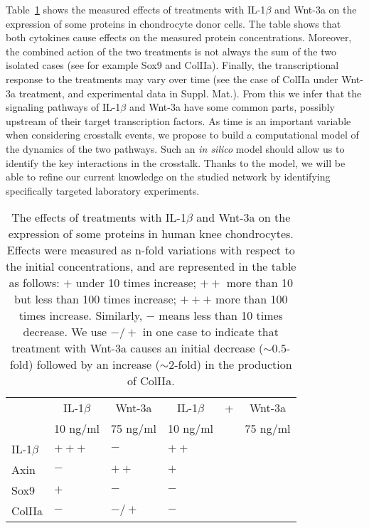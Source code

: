

Table~\ref{tab:pcr-effects} shows the measured effects of treatments with IL-1$\beta$ and Wnt-3a
on the expression of some proteins in chondrocyte donor cells.
The table shows that both cytokines cause effects on the measured protein concentrations. Moreover,
the combined action of the two treatments is not always the sum of the
two isolated cases (see for example Sox9 and ColIIa).
Finally, the transcriptional response to the treatments may vary over time (see the case of ColIIa
under Wnt-3a treatment, and experimental data in Suppl. Mat.).
From this we infer that the signaling pathways of IL-1$\beta$ and Wnt-3a have some common
parts, possibly upstream of their target transcription factors.
As time is an important variable when considering crosstalk events, we propose to build
a computational model of the dynamics of the two pathways.
Such an \emph{in silico} model should allow us to identify the key interactions in the crosstalk.
Thanks to the model, we will be able to refine our current
knowledge on the studied network by identifying specifically targeted laboratory experiments.

\begin{table}[htbp]
\centering
\begin{tabular}{|l||l|l|lcl|}
\hline%
&\multicolumn{1}{|c|}{IL-1$\beta$}&\multicolumn{1}{|c|}{Wnt-3a}&\multicolumn{1}{|c}{IL-1$\beta$}&\hspace{-5mm}+\hspace{-5mm}&\multicolumn{1}{c|}{\hspace{-5mm}Wnt-3a}\\[-1ex]%
&\multicolumn{1}{|c|}{\scriptsize10 ng/ml}&\multicolumn{1}{|c|}{\scriptsize75 ng/ml}&\multicolumn{1}{|c}{\scriptsize10 ng/ml}&{}&\multicolumn{1}{c|}{\hspace{-5mm}\scriptsize75 ng/ml}  \\
\hline
\hline
  IL-1$\beta$ & $+++$ & $-$ & $++$ & & \\
\hline
  Axin & $-$ & $++$ & $+$ & & \\
\hline
  Sox9 & $+$ & $-$ & $-$ & & \\
\hline
  ColIIa & $-$ & $-/+$ & $-$ & & \\
\hline
\end{tabular}
\caption{The effects of treatments with IL-1$\beta$ and Wnt-3a on the expression of some proteins
in human knee chondrocytes. Effects were measured
as n-fold variations with respect to the initial concentrations, and are represented in the table as follows:
$+$ under 10 times increase; $++$ more than 10 but less than 100 times increase;
$+++$ more than 100 times increase. Similarly, $-$ means less than 10 times decrease.
We use $-/+$ in one case to indicate that treatment with Wnt-3a causes
an initial decrease ($\sim{}0.5$-fold) followed by an increase ($\sim{}2$-fold) in the production of ColIIa. \label{tab:pcr-effects}}
\end{table}
